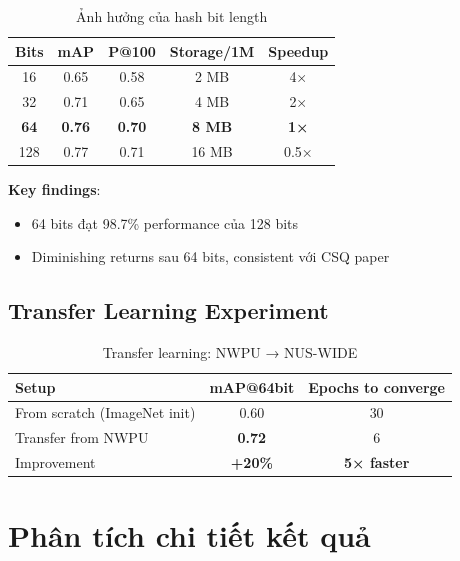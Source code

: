 \documentclass[12pt,a4paper]{article}
\begin{document}
\begin{table}[H]
\centering
\caption{Ảnh hưởng của hash bit length}
\label{tab:ablation_bits}
\begin{tabular}{c|cc|cc}
\toprule
\textbf{Bits} & \textbf{mAP} & \textbf{P@100} & \textbf{Storage/1M} & \textbf{Speedup} \\
\midrule
16 & 0.65 & 0.58 & 2 MB & 4× \\
32 & 0.71 & 0.65 & 4 MB & 2× \\
\textbf{64} & \textbf{0.76} & \textbf{0.70} & \textbf{8 MB} & \textbf{1×} \\
128 & 0.77 & 0.71 & 16 MB & 0.5× \\
\bottomrule
\end{tabular}
\end{table}

\textbf{Key findings}:
\begin{itemize}
    \item 64 bits đạt 98.7\% performance của 128 bits
    \item Diminishing returns sau 64 bits, consistent với CSQ paper \cite{yuan2020csq}
\end{itemize}

\subsection{Transfer Learning Experiment}

\begin{table}[H]
\centering
\caption{Transfer learning: NWPU → NUS-WIDE}
\begin{tabular}{lcc}
\toprule
\textbf{Setup} & \textbf{mAP@64bit} & \textbf{Epochs to converge} \\
\midrule
From scratch (ImageNet init) & 0.60 & 30 \\
Transfer from NWPU & \textbf{0.72} & 6 \\
\midrule
Improvement & \textbf{+20\%} & \textbf{5× faster} \\
\bottomrule
\end{tabular}
\end{table}

\section{Phân tích chi tiết kết quả}
\end{document}
